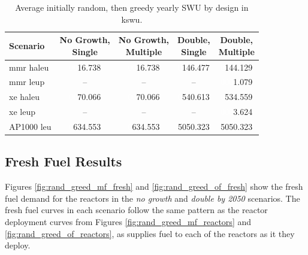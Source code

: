 \begin{table}[H]
    \centering
    \caption{Average initially random, then greedy yearly SWU by design in k\gls{swu}.}
    \label{tab:rand_greed_swu_avg}
    \begin{tabular}{l c c c c}
       \toprule
       Scenario & \shortstack{No Growth,\\ Single} & \shortstack{No Growth,\\ Multiple} & \shortstack{Double,\\ Single} & \shortstack{Double,\\ Multiple}  \\
       \midrule
       \gls{mmr} \gls{haleu}   & \textcolor{white}{00}16.738  & \textcolor{white}{00}16.738  & \textcolor{white}{0}146.477  & \textcolor{white}{0}144.129  \\
       \gls{mmr} \gls{leup}    & --      & --      & --       & \textcolor{white}{000}1.079    \\
       \gls{xe} \gls{haleu}    & \textcolor{white}{00}70.066  & \textcolor{white}{00}70.066  & \textcolor{white}{0}540.613  & \textcolor{white}{0}534.559  \\
       \gls{xe} \gls{leup}     & --      & --      & --       & \textcolor{white}{000}3.624    \\
       AP1000 \gls{leu}        & \textcolor{white}{0}634.553 & \textcolor{white}{0}634.553 & 5050.323 & 5050.323 \\
       \bottomrule
    \end{tabular}
\end{table}



\subsection{Fresh Fuel Results}
\label{sec:rand_greed_fresh}

Figures \ref{fig:rand_greed_mf_fresh} and \ref{fig:rand_greed_of_fresh} show the fresh fuel demand for the reactors in the \textit{no growth} and \textit{double by 2050} scenarios. The fresh fuel curves in each scenario follow the same pattern as the reactor deployment curves from Figures \ref{fig:rand_greed_mf_reactors} and \ref{fig:rand_greed_of_reactors}, as \cyclus supplies fuel to each of the reactors as it they deploy.


